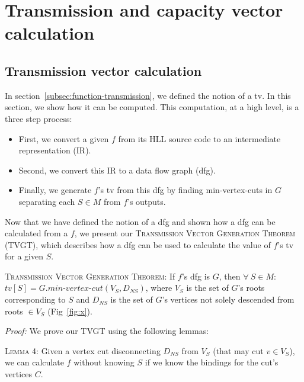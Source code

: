\section{Transmission and capacity vector calculation}
\label{sec:v-calculation}

\subsection{Transmission vector calculation}
\label{subsec:tv-calculation}
In section~\ref{subsec:function-transmission}, we defined the notion of a tv. In this section, we show how it can be computed. This computation, at a high level, is a three step process:
\begin{itemize}
  \item First, we convert a given $f$ from its HLL source code to an intermediate representation (IR).

  \item Second, we convert this IR to a data flow graph (dfg).

  \item Finally, we generate $f$'s tv from this dfg by finding min-vertex-cuts in $G$ separating each $S \in M$ from $f$'s outputs.
\end{itemize}



 Now that we have defined the notion of a dfg and shown how a dfg can be calculated from a $f$, we present our \textsc{Transmission Vector Generation Theorem} (TVGT), which describes how a dfg can be used to calculate the value of $f$'s tv for a given $S$.

\vspace{2mm}
\noindent \textsc{Transmission Vector Generation Theorem:} If $f$'s dfg is $G$, then $\forall\ S \in M$: $tv[S] = G.\textit{min-vertex-cut}(V_S, D_{NS})$, where $V_S$ is the set of $G$'s roots corresponding to $S$ and $D_{NS}$ is the set of $G$'s vertices not solely descended from roots $\in V_S$ (Fig~\ref{fig:x}).
\vspace{2mm}

\noindent \textit{Proof:} We prove our TVGT using the following lemmas:

\vspace{2mm}
\noindent \textsc{Lemma 4:} Given a vertex cut disconnecting $D_{NS}$ from $V_S$ (that may cut $v \in V_S$), we can calculate $f$ without knowing $S$ if we know the bindings for the cut's vertices $C$.
\vspace{2mm}

